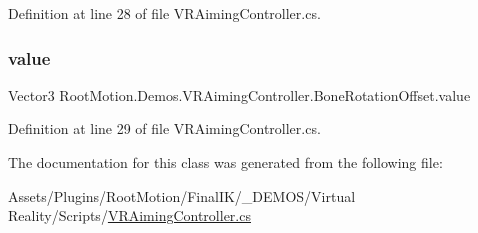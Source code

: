 Definition at line 28 of file V\+R\+Aiming\+Controller.\+cs.

\mbox{\label{class_root_motion_1_1_demos_1_1_v_r_aiming_controller_1_1_bone_rotation_offset_aa0aa1e2e2ab44a35f765ed8f552f4154}} 
\subsubsection{\texorpdfstring{value}{value}}
{\footnotesize\ttfamily Vector3 Root\+Motion.\+Demos.\+V\+R\+Aiming\+Controller.\+Bone\+Rotation\+Offset.\+value}



Definition at line 29 of file V\+R\+Aiming\+Controller.\+cs.



The documentation for this class was generated from the following file\+:\begin{DoxyCompactItemize}
\item 
Assets/\+Plugins/\+Root\+Motion/\+Final\+I\+K/\+\_\+\+D\+E\+M\+O\+S/\+Virtual Reality/\+Scripts/\mbox{\hyperlink{_v_r_aiming_controller_8cs}{V\+R\+Aiming\+Controller.\+cs}}\end{DoxyCompactItemize}
